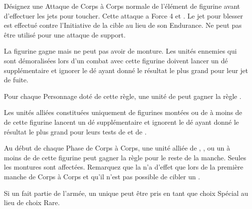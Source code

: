 \armyspecialruleentry{\petrifyingstare}

Désignez une Attaque de Corps à Corps normale de l'élément de figurine avant d'effectuer les jets pour toucher. Cette attaque a Force 4 et . Le jet pour blesser est effectué contre l'Initiative de la cible au lieu de son Endurance. Ne peut pas être utilisé pour une attaque de support.

\setlength{\columnseprule}{0.5pt}
\renewcommand{\columnseprulecolor}{\color{black!30}}
\begin{multicols}{2}\raggedcolumns
\armyspecialruleentry{\fleetcommander}

La figurine gagne  mais ne peut pas avoir de monture. Les unités ennemies qui sont démoralisées lors d'un combat avec cette figurine doivent lancer un dé supplémentaire et ignorer le dé ayant donné le résultat le plus grand pour leur jet de fuite.

Pour chaque Personnage doté de cette règle, une unité de \corsairs{} peut gagner la règle \vanguard{}.

\columnbreak
\armyspecialruleentry{\beastmaster}

Les unités alliées constituées uniquement de figurines montées ou de \monsters{} à moins de  de cette figurine lancent un dé supplémentaire et ignorent le dé ayant donné le résultat le plus grand pour leurs tests de \frenzy{} et de \stupidity{}.

Au début de chaque Phase de Corps à Corps, une unité alliée de \cavalry{}, \chariot{}, \monstrouscavalry{} ou un \monster{} à moins de  de cette figurine peut gagner la règle \hatred{} pour le reste de la manche. Seules les montures sont affectées. Remarquez que la \hatred{} n'a d'effet que lors de la première manche de Corps à Corps et qu'il n'est pas possible de cibler un \riddenmonster{}.

Si un \beastmaster{} fait partie de l'armée, un unique \kraken{} peut être pris en tant que choix Spécial au lieu de choix Rare.

\end{multicols}
\setlength{\columnseprule}{0pt}

\closearmyspecialrules




\newpage
{}

